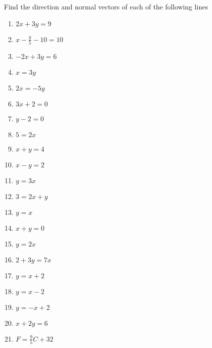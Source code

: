 Find the direction and normal vectors of each of the following lines
\begin{enumerate}[label=\thesubsection.\arabic*,ref=\thesubsection.\theenumi]
\item $2x+3y=9$
\item $x-\frac{y}{5}-10=10$
\item $-2x+3y=6$
\item $ x=3y$
\item $2x=-5y$
\item $3x+2=0$
\item $y-2=0$
\item $5=2x$
\item $x+y=4$
\item $x-y=2$
\item $y=3x$
\item $3=2x+y$
\item $y=x$
\item $x+y=0$
\item $y=2x$
\item $2+3y=7x$
\item $y=x+2$
\item $y=x-2$
\item $y=-x+2$
\item $x+2y=6$
\item $F=\frac{9}{5}C+32$
\end{enumerate}

